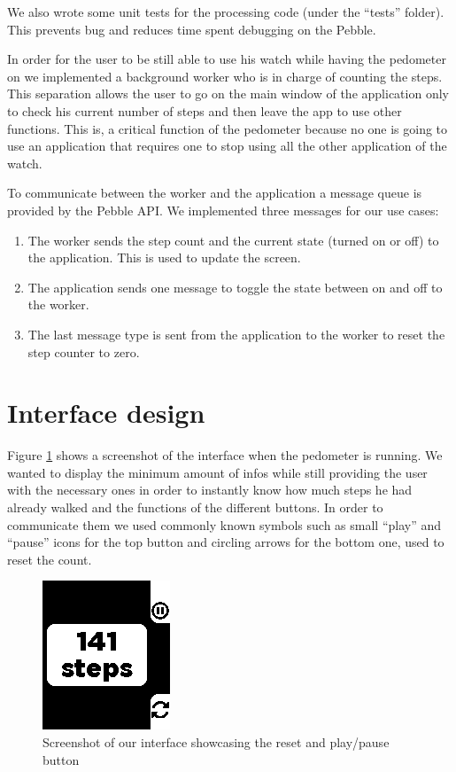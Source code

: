 \documentclass[12pt,twoside,a4paper]{article}
\begin{document}
We also wrote some unit tests for the processing code (under the ``tests'' folder).
This prevents bug and reduces time spent debugging on the Pebble.

In order for the user to be still able to use his watch while having the pedometer on we implemented a background worker who is in charge of counting the steps.
This separation allows the user to go on the main window of the application only to check his current number of steps and then leave the app to use other functions.
This is, a critical function of the pedometer because no one is going to use an application that requires one to stop using all the other application of the watch.

To communicate between the worker and the application a message queue is provided by the Pebble API.
We implemented three messages for our use cases:
\begin{enumerate}
    \item The worker sends the step count and the current state (turned on or off) to the application.
        This is used to update the screen.
    \item The application sends one message to toggle the state between on and off to the worker.
    \item The last message type is sent from the application to the worker to reset the step counter to zero.
\end{enumerate}

\section{Interface design}
Figure \ref{fig:interface} shows a screenshot of the interface when the pedometer is running. We wanted to display the 
minimum amount of infos while still providing the user with the necessary ones in order to instantly know how much 
steps he had already walked and the functions of the different buttons. In order to communicate them we used commonly 
known symbols such as small ``play'' and ``pause'' icons for the top button and circling arrows for the bottom one, 
used to reset the count.
\begin{figure}[h]
    \centering
    \includegraphics{screenshot}
    \caption{Screenshot of our interface showcasing the reset and play/pause button}
    \label{fig:interface}
\end{figure}
\end{document}
